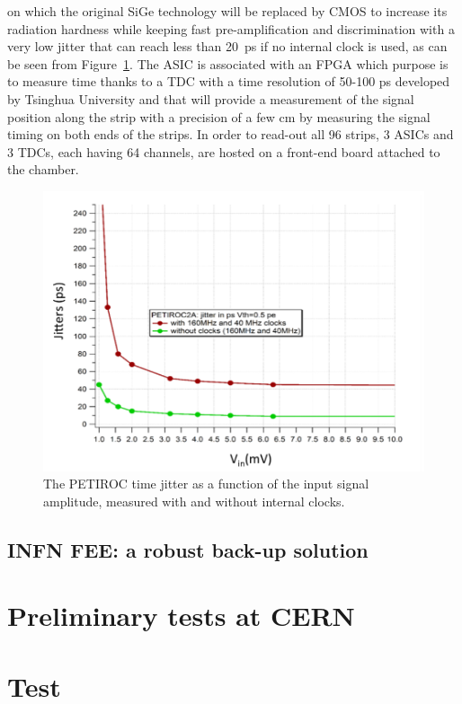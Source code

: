 	 on which the original SiGe technology will be replaced by CMOS to increase its radiation hardness while keeping fast pre-amplification and discrimination with a very low jitter that can reach less than \SI{20}{ps} if no internal clock is used, as can be seen from Figure~\ref{fig:jitter}. The ASIC is associated with an FPGA which purpose is to measure time thanks to a TDC with a time resolution of 50-100 \si{ps} developed by Tsinghua University and that will provide a measurement of the signal position along the strip with a precision of a few \si{cm} by measuring the signal timing on both ends of the strips. In order to read-out all 96 strips, 3 ASICs and 3 TDCs, each having 64 channels, are hosted on a front-end board attached to the chamber.

	\begin{figure}[H]
		\centering
		\includegraphics[width=0.8\plotwidth]{fig/chapt6/jitter-PETIROC.png}
		\caption{\label{fig:jitter} The PETIROC time jitter as a function of the input signal amplitude, measured with and without internal clocks.}
	\end{figure}

	\subsection{INFN \acl{FEE}: a robust back-up solution}
	\label{chapt6:ssec:INFN}

\section{Preliminary tests at CERN}

\section{Test }

\clearpage{\pagestyle{empty}\cleardoublepage}